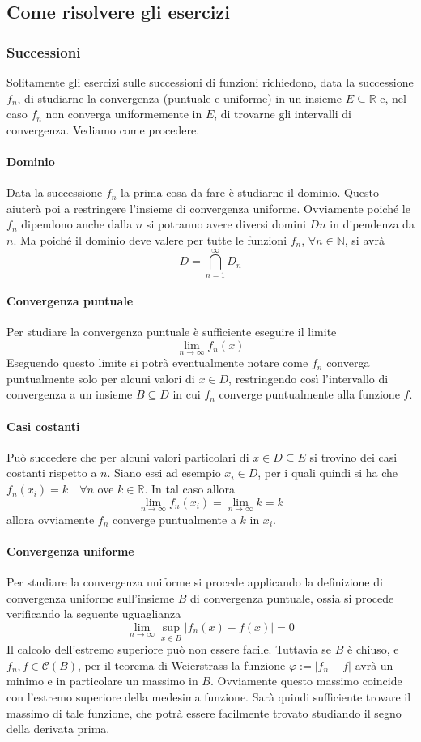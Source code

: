 \documentclass[a4paper,12pt]{article}
\newcommand{\cont}{\mathscr{C}}
\begin{document}
\subsection{Come risolvere gli esercizi}

\subsubsection{Successioni}
Solitamente gli esercizi sulle successioni di funzioni richiedono, data la successione ${f_n}$, di studiarne la convergenza (puntuale e uniforme) in un insieme $E\subseteq \mathbb{R}$ e, nel caso $f_n$ non converga uniformemente in $E$, di trovarne gli intervalli di convergenza. Vediamo come procedere.
\paragraph*{Dominio}
Data la successione ${f_n}$ la prima cosa da fare è studiarne il dominio. Questo aiuterà poi a restringere l'insieme di convergenza uniforme. Ovviamente poiché le $f_n$ dipendono anche dalla $n$ si potranno avere diversi domini $Dn$ in dipendenza da $n$. Ma poiché il dominio deve valere per tutte le funzioni $f_n$, $\forall n\in\mathbb{N}$, si avrà
$$D=\displaystyle\bigcap_{n=1}^{\infty} D_n$$
\paragraph*{Convergenza puntuale}
Per studiare la convergenza puntuale è sufficiente eseguire il limite
$$\lim_{n\to\infty} f_n(x)$$
Eseguendo questo limite si potrà eventualmente notare come ${f_n}$ converga puntualmente solo per alcuni valori di $x\in D$, restringendo così l'intervallo di convergenza a un insieme $B\subseteq D$ in cui $f_n$ converge puntualmente alla funzione $f$.
\paragraph*{Casi costanti}
Può succedere che per alcuni valori particolari di $x\in D\subseteq E$ si trovino dei casi costanti rispetto a $n$. Siano essi ad esempio $x_i \in D$, per i quali quindi si ha che $f_n(x_i)=k \quad \forall n$  ove $k\in \mathbb{R}$. In tal caso allora 
$$\lim_{n\to\infty} f_n(x_i)=\lim_{n\to\infty} k = k $$
allora ovviamente $f_n$ converge puntualmente a $k$ in $x_i$.
\paragraph*{Convergenza uniforme}
Per studiare la convergenza uniforme si procede applicando la definizione di convergenza uniforme sull'insieme $B$ di convergenza puntuale, ossia si procede verificando la seguente uguaglianza
$$\lim_{n\to\infty} \sup_{x\in B} |f_n(x)- f(x)|=0$$
Il calcolo dell'estremo superiore può non essere facile. Tuttavia se $B$ è chiuso, e $f_n, f \in\cont(B)$,   per il teorema di Weierstrass la funzione $\varphi:=|f_n-f|$ avrà un minimo e in particolare un massimo in $B$. Ovviamente questo massimo coincide con l'estremo superiore della medesima funzione. Sarà quindi sufficiente trovare il massimo di tale funzione, che potrà essere facilmente trovato studiando il segno della derivata prima.
\end{document}
